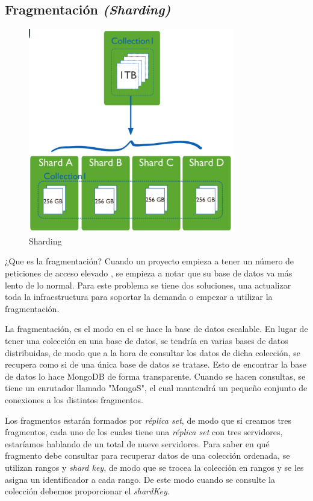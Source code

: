 \subsection{Fragmentación \textit{(Sharding)}}
\begin{figure}[!h]
    \centering
    \includegraphics[width=90mm]{img/infraestructura/shard.png}
    \caption{Sharding}
\end{figure}
¿Que es la fragmentación?
Cuando un proyecto empieza a tener un número de peticiones de acceso elevado , se empieza a notar que su base de datos va más lento de lo normal. Para este problema se tiene dos soluciones, una actualizar toda la infraestructura para soportar la demanda o empezar a utilizar la fragmentación.

La fragmentación, es el modo en el se hace la base de datos escalable. En lugar de tener una colección en una base de datos, se tendría en varias bases de datos distribuidas, de modo que a la hora de consultar los datos de dicha colección, se recupera como si de una única base de datos se tratase. Esto de encontrar la base de datos lo hace MongoDB de forma transparente. Cuando se hacen consultas, se tiene un enrutador llamado "MongoS", el cual mantendrá un pequeño conjunto de conexiones a los distintos fragmentos.

Los fragmentos estarán formados por \textit{réplica set}, de modo que si creamos tres fragmentos, cada uno de los cuales tiene una \textit{réplica set} con tres servidores, estaríamos hablando de un total de nueve servidores. Para saber en qué fragmento debe consultar para recuperar datos de una colección ordenada, se utilizan rangos y \textit{shard key}, de modo que se trocea la colección en rangos y se les asigna un identificador a cada rango. De este modo cuando se consulte la colección debemos proporcionar el \textit{shardKey}.

